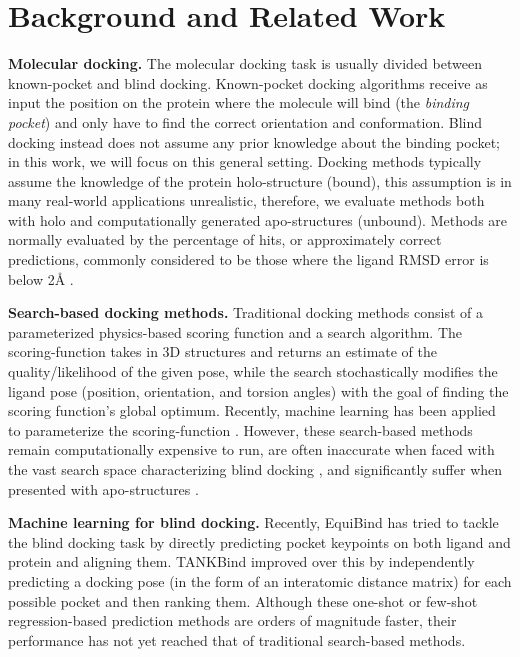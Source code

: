 \documentclass{article} \usepackage{iclr2023_conference,times}
\begin{document}
\section{Background and Related Work} \label{sec:background}

\textbf{Molecular docking.} The molecular docking task is usually divided between known-pocket and blind docking. Known-pocket docking algorithms receive as input the position on the protein where the molecule will bind (the \emph{binding pocket}) and only have to find the correct orientation and conformation. Blind docking instead does not assume any prior knowledge about the binding pocket; in this work, we will focus on this general setting. Docking methods typically assume the knowledge of the protein holo-structure (bound), this assumption is in many real-world applications unrealistic, therefore, we evaluate methods both with holo and computationally generated apo-structures (unbound). Methods are normally evaluated by the percentage of hits, or approximately correct predictions, commonly considered to be those where the ligand RMSD error is below 2\AA{} \citep{Alhossary2015QuickVina2, Hassan2017QVinaW, mcnutt2021gnina}. 



\textbf{Search-based docking methods.} Traditional docking methods \citep{trott2010autodock,halgren2004glide,thomsen2006moldock} consist of a parameterized physics-based scoring function and a search algorithm. The scoring-function takes in 3D structures and returns an estimate of the quality/likelihood of the given pose, while the search stochastically modifies the ligand pose (position, orientation, and torsion angles) with the goal of finding the scoring function's global optimum. Recently, machine learning has been applied to parameterize the scoring-function \citep{mcnutt2021gnina, mendez2021deepdock}. However, these search-based methods remain computationally expensive to run, are often inaccurate when faced with the vast search space characterizing blind docking \citep{equibind}, and significantly suffer when presented with apo-structures \citep{wong2022benchmarking}. 

\textbf{Machine learning for blind docking.} Recently, EquiBind \citep{equibind} has tried to tackle the blind docking task by directly predicting pocket keypoints on both ligand and protein and aligning them. TANKBind \citep{Lu2022TankBind} improved over this by independently predicting a docking pose (in the form of an interatomic distance matrix) for each possible pocket and then ranking 
them. Although these one-shot or few-shot regression-based prediction methods are orders of magnitude faster, their performance has not yet reached that of traditional search-based methods. 
\end{document}
